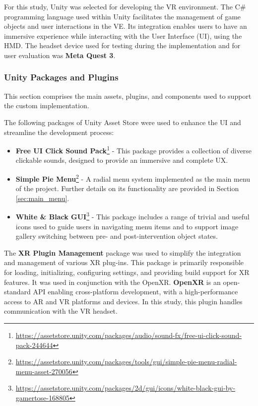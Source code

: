 For this study, Unity was selected for developing the \gls{VR} environment. The C\# programming language used within Unity facilitates the management of game objects and user interactions in the \gls{VE}.
Its integration enables users to have an immersive experience while interacting with the User Interface (\gls{UI}), using the \gls{HMD}.
The headset device used for testing during the implementation and for user evaluation was \textbf{Meta Quest 3}.

\subsubsection{Unity Packages and Plugins}
This section comprises the main assets, plugins, and components used to support the custom implementation.

The following packages of Unity Asset Store were used to enhance the \gls{UI} and streamline the development process:

\begin{itemize}
\item{\textbf{Free UI Click Sound Pack}\footnote{\url{https://assetstore.unity.com/packages/audio/sound-fx/free-ui-click-sound-pack-244644}} - This package provides a collection of diverse clickable sounds, designed to provide an immersive and complete \gls{UX}.}
\item{\textbf{Simple Pie Menu}\footnote{\url{https://assetstore.unity.com/packages/tools/gui/simple-pie-menu-radial-menu-asset-270056}}} - A radial menu system implemented as the main menu of the project. Further details on its functionality are provided in Section \ref{sec:main_menu}.
\item{\textbf{White \& Black GUI}\footnote{\url{https://assetstore.unity.com/packages/2d/gui/icons/white-black-gui-by-gamertose-168805}}} - This package includes a range of trivial and useful icons used to guide users in navigating menu items and to support image gallery switching between pre- and post-intervention object states.
\end{itemize}



The \textbf{\gls{XR} Plugin Management} package was used to simplify the integration and management of various \gls{XR} plug-ins. 
This package is primarily responsible for loading, initializing, configuring settings, and providing build support for \gls{XR} features. 
It was used in conjunction with the OpenXR. \textbf{OpenXR} is an open-standard \gls{API} enabling cross-platform development, with a high-performance access to \gls{AR} and \gls{VR} platforms and devices. In this study, this plugin handles communication with the \gls{VR} headset.

